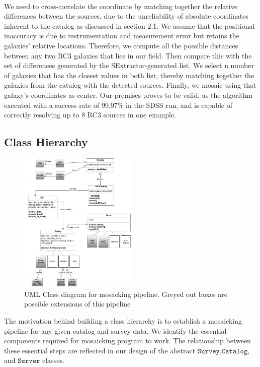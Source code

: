 \documentclass[5p]{elsarticle}
\begin{document}
\\
\indent  We need to cross-correlate the coordinate by matching together the relative differences between the sources, due to the unreliability of absolute coordinates inherent to the catalog as discussed in section 2.1. We assume that the positional inaccuracy is due to  instrumentation and measurement error but retains the galaxies' relative locations.  %
Therefore, we compute all the possible distances between any two RC3 galaxies that lies in our field. Then compare this with the set of differences generated by the SExtractor-generated list. We select n number of galaxies that has the closest values in both list, thereby matching together the galaxies from the catalog  with the detected sources. Finally, we mosaic using that galaxy's coordinates as center. Our premises proves to be valid, as the algorithm executed with a success rate of 99.97\% in the SDSS run, and is capable of correctly resolving up to 8 RC3 sources in one example.
	\subsection{Class Hierarchy}
	\begin{figure}[h]
		\includegraphics[width=0.5\textwidth]{figures/hierarchy}
		\caption{UML Class diagram for mosacking pipeline. Greyed out boxes are possible extensions of this pipeline}
	\end{figure}
 	The motivation behind building a class hierarchy is to establish a mosaicking pipeline for any given catalog and survey data. We identify the essential components required for mosaicking program to work. The relationship between these essential steps are reflected in our design of the abstract $\texttt{Survey}$,$\texttt{Catalog}$, and $\texttt{Server}$ classes. 
\end{document}
